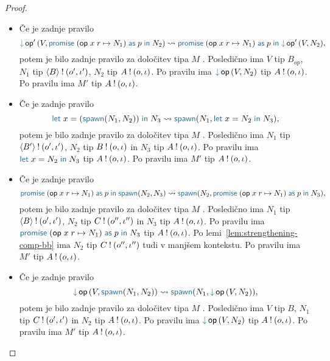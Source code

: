 \begin{proof}
\begin{itemize}
		\item Če je zadnje pravilo $$\tmopin{op'}{V}{\tmwithrec{op}{x}{r}{N_1}{p}{N_2}} \reduces \tmwithrec{op}{x}{r}{N_1}{p}{\tmopin{op'}{V}{N_2}},$$ potem je bilo zadnje pravilo za določitev tipa $M$ .
		Posledično ima $V$ tip $B_{op}$, $N_1$ tip $\langle B \rangle \mathbin{!} (o', \iota')$, $N_2$ tip $A \mathbin{!} (o, \iota)$.
		Po pravilu  ima $\tmopin{op}{V}{N_2}$ tip $A \mathbin{!} (o, \iota)$.
		Po pravilu  ima $M'$ tip $A \mathbin{!} (o, \iota)$.

		\item Če je zadnje pravilo $$\tmlet{x}{(\tmspawn{N_1}{N_2})}{N_3} \reduces \tmspawn{N_1}{\tmlet{x}{N_2}{N_3}},$$ potem je bilo zadnje pravilo za določitev tipa $M$ .
		Posledično ima $N_1$ tip $\langle B' \rangle \mathbin{!} (o', \iota')$, $N_2$ tip $B \mathbin{!} (o, \iota)$ in $N_3$ tip $A \mathbin{!} (o, \iota)$.
		Po pravilu  ima $\tmlet{x}{N_2}{N_3}$ tip $A \mathbin{!} (o, \iota)$.
		Po pravilu  ima $M'$ tip $A \mathbin{!} (o, \iota)$.


		\item Če je zadnje pravilo $$\tmwithrec{op}{x}{r}{N_1}{p}{\tmspawn{N_2}{N_3}} \reduces \tmspawn{N_2}{\tmwithrec{op}{x}{r}{N_1}{p}{N_3}},$$ potem je bilo zadnje pravilo za določitev tipa $M$ .
		Posledično ima $N_1$ tip $\langle B \rangle \mathbin{!} (o', \iota')$, $N_2$ tip $C \mathbin{!} (o'', \iota'')$ in $N_3$ tip $A \mathbin{!} (o, \iota)$.
		Po pravilu  ima $\tmwithrec{op}{x}{r}{N_1}{p}{N_3}$ tip $A \mathbin{!} (o, \iota)$.
		Po lemi~\ref{lem:strengthening-comp-bb} ima $N_2$ tip $C \mathbin{!} (o'', \iota'')$ tudi v manjšem kontekstu.
		Po pravilu  ima $M'$ tip $A \mathbin{!} (o, \iota)$.

		\item Če je zadnje pravilo $$\tmopin{op}{V}{\tmspawn{N_1}{N_2}} \reduces \tmspawn{N_1}{\tmopin{op}{V}{N_2}},$$ potem je bilo zadnje pravilo za določitev tipa $M$ .
		Posledično ima $V$ tip $B$, $N_1$ tip $C \mathbin{!} (o', \iota')$ in $N_2$ tip $A \mathbin{!} (o, \iota)$.
		Po pravilu  ima $\tmopin{op}{V}{N_2}$ tip $A \mathbin{!} (o, \iota)$.
		Po pravilu  ima $M'$ tip $A \mathbin{!} (o, \iota)$.
		
	\end{itemize}
	
\end{proof}


